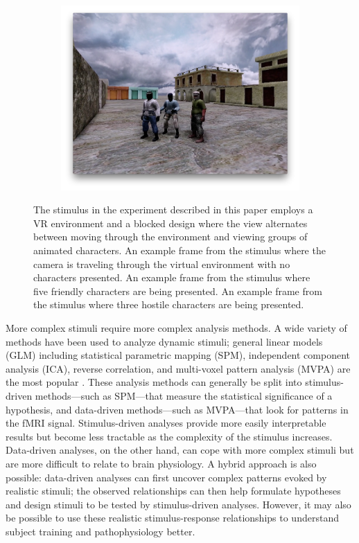 \documentclass[review,1p,authoryear]{elsarticle}
\begin{document}
\begin{figure}
\begin{subfigure}{0.3\textwidth}
\includegraphics[width=\textwidth]{figures/stimulus-three-insurgents}
\caption{}
\label{fig:stimulus-three-insurgents}
\end{subfigure}
\caption{
The stimulus in the experiment described in this paper employs a VR environment and a blocked design where the view alternates between moving through the environment and viewing groups of animated characters.
 An example frame from the stimulus where the camera is traveling through the virtual environment with no characters presented.
 An example frame from the stimulus where five friendly characters are being presented.
 An example frame from the stimulus where three hostile characters are being presented.}
\label{fig:stimulus}
\end{figure}

More complex stimuli require more complex analysis methods.
A wide variety of methods have been used to analyze dynamic stimuli; general linear models (GLM) including statistical parametric mapping (SPM), independent component analysis (ICA), reverse correlation, and multi-voxel pattern analysis (MVPA) are the most popular \citep{Spiers2007}.
These analysis methods can generally be split into stimulus-driven methods---such as SPM---that measure the statistical significance of a hypothesis, and data-driven methods---such as MVPA---that look for patterns in the fMRI signal.
Stimulus-driven analyses provide more easily interpretable results but become less tractable as the complexity of the stimulus increases.
Data-driven analyses, on the other hand, can cope with more complex stimuli but are more difficult to relate to brain physiology.
A hybrid approach is also possible: data-driven analyses can first uncover complex patterns evoked by realistic stimuli; the observed relationships can then help formulate hypotheses and design stimuli to be tested by stimulus-driven analyses. 
However, it may also be possible to use these realistic stimulus-response relationships to understand subject training and pathophysiology better.
\end{document}
